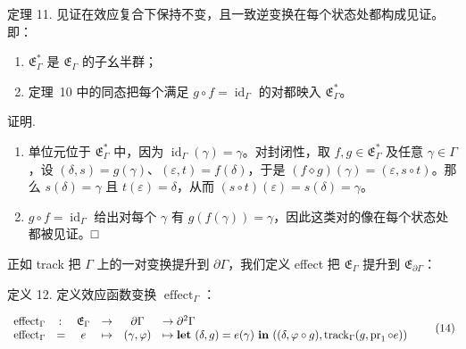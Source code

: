 定理 11. 见证在效应复合下保持不变，且一致逆变换在每个状态处都构成见证。即：

\begin{enumerate}
\def\labelenumi{\arabic{enumi}.}
\item
  \(\mathfrak { E } _ { \Gamma } ^ { * }\) 是 \(\mathfrak { E } _ { \Gamma }\) 的子幺半群；
\item
  定理~10 中的同态把每个满足 \(g \circ f = \operatorname { i d } _ { \Gamma }\) 的对都映入
  \(\mathfrak { E } _ { \Gamma } ^ { * }\)。
\end{enumerate}

证明.

\begin{enumerate}
\def\labelenumi{\arabic{enumi}.}
\item
  单位元位于 \(\mathfrak { E } _ { \Gamma } ^ { * }\) 中，因为
  \(\operatorname { i d } _ { \Gamma } ( \gamma ) = \gamma\)。对封闭性，取
  \(f , g \in \mathfrak { E } _ { \Gamma } ^ { * }\) 及任意 \(\gamma \in \Gamma\)，设
  \(( \delta , s ) = g ( \gamma )\)、\(( \varepsilon , t ) = f ( \delta )\)，于是
  \(( f \diamond g ) ( \gamma ) = ( \varepsilon , s \circ t )\)。那么
  \(s ( \delta ) = \gamma\) 且 \(t ( \varepsilon ) = \delta\)，从而
  \(( s \circ t ) ( \varepsilon ) = s ( \delta ) = \gamma\)。
\item
  \(g \circ f = \operatorname { i d } _ { \Gamma }\) 给出对每个 \(\gamma\) 有
  \(g ( f ( \gamma ) ) = \gamma\)，因此这类对的像在每个状态处都被见证。□
\end{enumerate}

正如 track 把 $\Gamma$ 上的一对变换提升到 \(\partial \Gamma\)，我们定义 effect 把
\(\mathfrak { E } _ { \Gamma }\) 提升到 \(\mathfrak { E } _ { \partial \Gamma }\)：

定义 12. 定义效应函数变换 \(\operatorname { e f f e c t } _ { \Gamma }\)：

\[
\begin{array} { l r c l c l }
  { \operatorname { e f f e c t } _ { \Gamma } } & { \colon } & { \mathfrak { E } _ { \Gamma } } & { \to } & { \partial \Gamma } & { \to \partial ^ { 2 } \Gamma } \\
  { \operatorname { e f f e c t } _ { \Gamma } } & { = } & { e } & { \mapsto } & { ( \gamma , \varphi ) } & { \mapsto \mathbf { l e t } \ ( \delta , g ) = e ( \gamma ) \ \mathbf { i n } \ ( ( \delta , \varphi \circ g ) , \operatorname { t r a c k } _ { \Gamma } ( g , \operatorname { p r } _ { 1 } \circ e ) ) }
\end{array}\tag{14}
\]

